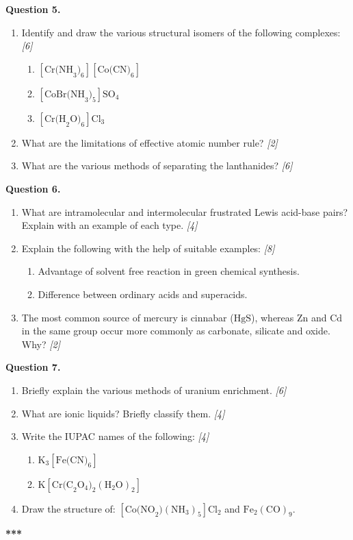 \documentclass[11pt,a4paper]{article}
\newcommand{\pts}[1]{\hfill \textit{[#1]}}
\begin{document}
\bigskip

\noindent \textbf{Question 5.}
\begin{enumerate}[label=(\alph*)]
  \item Identify and draw the various structural isomers of the following complexes: \pts{6}
  \begin{enumerate}[label=(\roman*)]
    \item $[\text{Cr(NH}_3)_6][\text{Co(CN)}_6]$
    \item $[\text{CoBr(NH}_3)_5]\text{SO}_4$
    \item $[\text{Cr(H}_2\text{O})_6]\text{Cl}_3$
  \end{enumerate}
  \item What are the limitations of effective atomic number rule? \pts{2}
  \item What are the various methods of separating the lanthanides? \pts{6}
\end{enumerate}

\bigskip

\noindent \textbf{Question 6.}
\begin{enumerate}[label=(\alph*)]
  \item What are intramolecular and intermolecular frustrated Lewis acid-base pairs? Explain with an example of each type. \pts{4}
  \item Explain the following with the help of suitable examples: \pts{8}
  \begin{enumerate}[label=(\roman*)]
    \item Advantage of solvent free reaction in green chemical synthesis.
    \item Difference between ordinary acids and superacids.
  \end{enumerate}
  \item The most common source of mercury is cinnabar ($\text{HgS}$), whereas $\text{Zn}$ and $\text{Cd}$ in the same group occur more commonly as carbonate, silicate and oxide. Why? \pts{2}
\end{enumerate}

\bigskip

\noindent \textbf{Question 7.}
\begin{enumerate}[label=(\alph*)]
  \item Briefly explain the various methods of uranium enrichment. \pts{6}
  \item What are ionic liquids? Briefly classify them. \pts{4}
  \item Write the IUPAC names of the following: \pts{4}
  \begin{enumerate}[label=(\roman*)]
    \item $\text{K}_3[\text{Fe(CN)}_6]$
    \item $\text{K}[\text{Cr(C}_2\text{O}_4)_2(\text{H}_2\text{O})_2]$
  \end{enumerate}
  \item Draw the structure of: $[\text{Co(NO}_2)(\text{NH}_3)_5]\text{Cl}_2$ and $\text{Fe}_2(\text{CO})_9$.
\end{enumerate}

\bigskip
\begin{center}
  \textbf{***}
\end{center}
\end{document}
